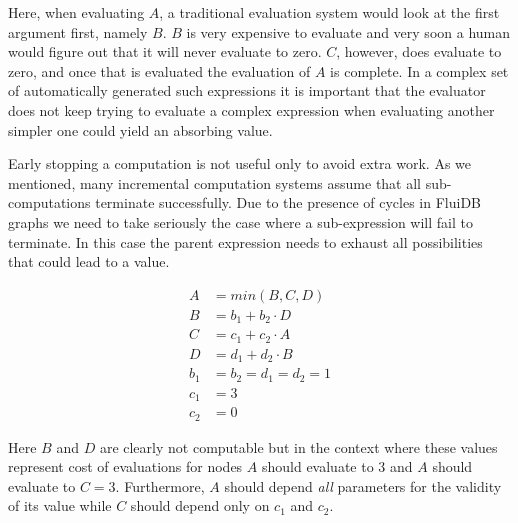 Here, when evaluating \(A\), a traditional evaluation system would
look at the first argument first, namely \(B\). \(B\) is very
expensive to evaluate and very soon a human would figure out that it
will never evaluate to zero. \(C\), however, does evaluate to zero,
and once that is evaluated the evaluation of \(A\) is complete. In a
complex set of automatically generated such expressions it is
important that the evaluator does not keep trying to evaluate a
complex expression when evaluating another simpler one could yield an
absorbing value.

Early stopping a computation is not useful only to avoid extra
work. As we mentioned, many incremental computation systems assume
that all sub-computations terminate successfully. Due to the presence
of cycles in FluiDB graphs we need to take seriously the case where a
sub-expression will fail to terminate. In this case the parent
expression needs to exhaust all possibilities that could lead to a
value.

\begin{align*}
A &= min(B, C, D) \\
B &= b_1 + b_2 \cdot D \\
C &= c_1 + c_2 \cdot A \\
D &= d_1 + d_2 \cdot B \\
b_1 &= b_2 = d_1 = d_2 = 1 \\
c_1 &= 3 \\
c_2 &= 0
\end{align*}

Here \(B\) and \(D\) are clearly not computable but in the context
where these values represent cost of evaluations for nodes \(A\)
should evaluate to 3 and \(A\) should evaluate to \(C =
3\). Furthermore, \(A\) should depend \emph{all} parameters for the
validity of its value while \(C\) should depend only on \(c_1\) and
\(c_2\).



